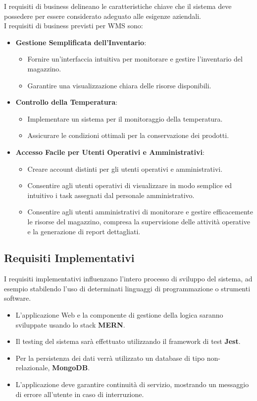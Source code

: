 I requisiti di business delineano le caratteristiche chiave che il sistema deve possedere
per essere considerato adeguato alle esigenze aziendali.\\
I requisiti di business previsti per WMS sono:
\begin{itemize}
    \item \textbf{Gestione Semplificata dell'Inventario}:
    \begin{itemize}
        \item Fornire un'interfaccia intuitiva per monitorare e gestire l'inventario del magazzino.
        \item Garantire una visualizzazione chiara delle risorse disponibili.
    \end{itemize}
    \item \textbf{Controllo della Temperatura}:
    \begin{itemize}
        \item Implementare un sistema per il monitoraggio della temperatura.
        \item Assicurare le condizioni ottimali per la conservazione dei prodotti.
    \end{itemize}
    \item \textbf{Accesso Facile per Utenti Operativi e Amministrativi}:
    \begin{itemize}
        \item Creare account distinti per gli utenti operativi e amministrativi.
        \item Consentire agli utenti operativi di visualizzare in modo semplice ed intuitivo i task assegnati dal personale amministrativo.
        \item Consentire agli utenti amministrativi di monitorare e gestire efficacemente le risorse del magazzino, compresa la supervisione delle attività operative e la generazione di report dettagliati.
    \end{itemize}
\end{itemize}

\subsection{Requisiti Implementativi}

I requisiti implementativi influenzano l'intero processo di sviluppo del
sistema, ad esempio stabilendo l'uso di determinati linguaggi di programmazione o strumenti software.\\
\begin{itemize}
    \item L'applicazione Web e la componente di gestione della logica saranno sviluppate usando lo stack \textbf{MERN}.
    \item Il testing del sistema sarà effettuato utilizzando il framework di test \textbf{Jest}.
    \item Per la persistenza dei dati verrà utilizzato un database di tipo non-relazionale, \textbf{MongoDB}.
    \item L'applicazione deve garantire continuità di servizio, mostrando un messaggio di errore all'utente in caso di interruzione.
\end{itemize}
